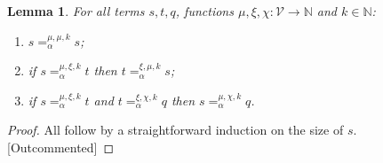 \documentclass{lmcs}
\theoremstyle{theorem}\newtheorem{theorem}{Theorem}
\theoremstyle{theorem}\newtheorem{lemma}[theorem]{Lemma}
\theoremstyle{theorem}\newtheorem{corollary}[theorem]{Corollary}
\theoremstyle{definition}\newtheorem{definition}[theorem]{Definition}
\theoremstyle{definition}\newtheorem{example}[theorem]{Example}
\newcommand{\N}{\mathbb{N}}
\newcommand{\F}{\mathcal{F}}
\newcommand{\V}{\mathcal{V}}
\newcommand{\Vfree}{\mathcal{V}_{\mathit{nonb}}}
\newcommand{\Vbound}{\mathcal{V}_{\mathit{binder}}}
\newcommand{\identifier}[1]{\mathtt{#1}}
\newcommand{\afun}{\identifier{f}}
\newcommand{\avar}{x}
\newcommand{\bvar}{y}
\newcommand{\abs}[2]{\lambda #1.#2}
\newcommand{\meta}[2]{#1\langle#2\rangle}
\newcommand{\tuple}[2]{\llparenthesis #1,\dots,#2 \rrparenthesis}
\begin{document}
\begin{lemma}\label{lem:alphaequiv}
For all terms $s,t,q$, functions $\mu,\xi,\chi : \V \to \N$ and $k \in \N$:
\begin{enumerate}
\item\label{lem:alphaequiv:reflexive}
  $s =_\alpha^{\mu,\mu,k} s$;
\item\label{lem:alphaequiv:symmetric}
  if $s =_\alpha^{\mu,\xi,k} t$ then $t =_\alpha^{\xi,\mu,k} s$;
\item\label{lem:alphaequiv:transitive}
  if $s =_\alpha^{\mu,\xi,k} t$ and $t =_\alpha^{\xi,\chi,k} q$ then $s =_\alpha^{\mu,\chi,k} q$.
\end{enumerate}
\end{lemma}

\begin{proof}
All follow by a straightforward induction on the size of $s$. [Outcommented]

\end{proof}
\end{document}
